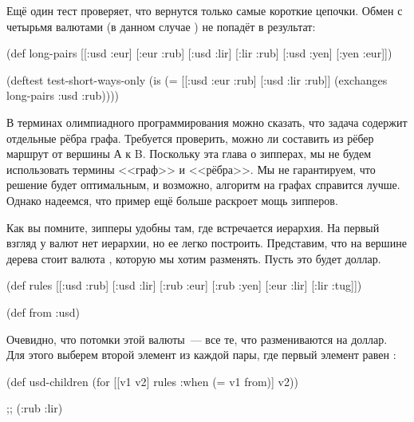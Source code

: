 Ещё один тест проверяет, что вернутся только самые короткие цепочки. Обмен с
четырьмя валютами (в данном случае ) не попадёт в
результат:

\begin{english}
  \begin{clojure}
(def long-pairs
  [[:usd :eur]
   [:eur :rub]
   [:usd :lir]
   [:lir :rub]
   [:usd :yen]
   [:yen :eur]])

(deftest test-short-ways-only
  (is (= [[:usd :eur :rub]
          [:usd :lir :rub]]
         (exchanges long-pairs :usd :rub))))
  \end{clojure}
\end{english}


В терминах олимпиадного программирования можно сказать, что задача содержит
отдельные рёбра графа. Требуется проверить, можно ли составить из рёбер маршрут
от вершины А к B. Поскольку эта глава о зипперах, мы не будем использовать
термины <<граф>> и <<рёбра>>. Мы не гарантируем, что решение будет оптимальным, и
возможно, алгоритм на графах справится лучше. Однако надеемся, что пример ещё
больше раскроет мощь зипперов.

Как вы помните, зипперы удобны там, где встречается иерархия. На первый взгляд у
валют нет иерархии, но ее легко построить. Представим, что на вершине дерева
стоит валюта , которую мы хотим разменять. Пусть это будет
доллар.

\begin{english}
  \begin{clojure}
(def rules
  [[:usd :rub]
   [:usd :lir]
   [:rub :eur]
   [:rub :yen]
   [:eur :lir]
   [:lir :tug]])

(def from :usd)
  \end{clojure}
\end{english}


Очевидно, что потомки этой валюты~--- все те, что размениваются на
доллар. Для этого выберем второй элемент из каждой пары, где первый элемент
равен :

\begin{english}
  \begin{clojure}
(def usd-children
  (for [[v1 v2] rules
        :when (= v1 from)]
    v2))

;; (:rub :lir)
  \end{clojure}
\end{english}

